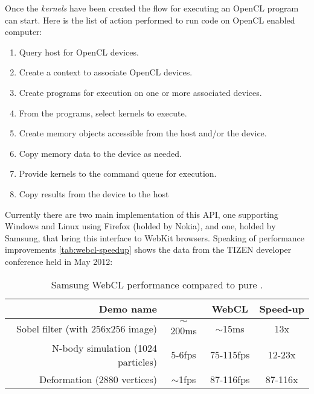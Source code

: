 Once the \emph{kernels} have been created the flow for executing an \ac{OpenCL}
program can start. Here is the list of action performed to run code on
\ac{OpenCL} enabled computer:
\begin{enumerate}
    \item Query host for \ac{OpenCL} devices.
    \item Create a context to associate \ac{OpenCL} devices.
    \item Create programs for execution on one or more associated devices.
    \item From the programs, select kernels to execute.
    \item Create memory objects accessible from the host and/or the device.
    \item Copy memory data to the device as needed.
    \item Provide kernels to the command queue for execution.
    \item Copy results from the device to the host
\end{enumerate}

Currently there are two main implementation of this API, one supporting Windows
and Linux using Firefox (holded by Nokia), and one, holded by Samsung, that
bring this interface to WebKit browsers. Speaking of performance improvements
\autoref{tab:webcl-speedup} shows the data from the TIZEN\tm{} developer
conference held in May 2012:
\begin{table}[h!tb]
    \caption{Samsung WebCL performance compared to pure \js{}.}
    \label{tab:webcl-speedup}
    \centering
    \begin{tabular}{r|c|c|c}
        \textbf{Demo name} & \textbf{\js{}} & \textbf{WebCL} & \textbf{Speed-up}\\
        \hline
        Sobel filter (with 256x256 image) & $\sim{}$200ms & $\sim{}$15ms & 13x\\
        \hline
        N-body simulation (1024 particles) & 5-6fps & 75-115fps & 12-23x\\
        \hline
        Deformation (2880 vertices) & $\sim{}$1fps & 87-116fps & 87-116x
    \end{tabular}
\end{table}
